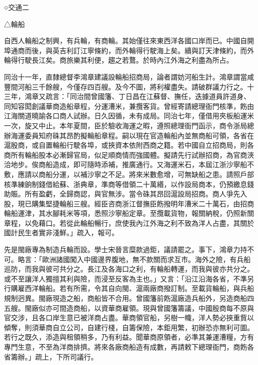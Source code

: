 
\begin{pinyinscope}
○交通二

△輪船

自西人輪船之制興，有兵輪，有商輪。其始僅往來東西洋各國口岸而已。中國自開埠通商而後，與英吉利訂江寧條約，而外輪得行駛海上矣。續與訂天津條約，而外輪得行駛長江矣。商旅樂其利便，趨之若鶩。於時內江外海之利盡為所占。

同治十一年，直隸總督李鴻章建議設輪船招商局，論者謂妨河船生計。鴻章謂當咸豐間河船三千餘艘，今僅存四百艘。及今不圖，將利權盡失。請破群議力行之。十三年，鴻章又疏言：「同治間曾國籓、丁日昌在江蘇督、撫任，迭據道員許道身、同知容閎創議華商造船章程，分運漕米，兼攬客貨。曾經寄請總理衙門核準，飭由江海關道曉諭各口商人試辦。日久因循，未有成局。同治七年，僅借用夾板船運米一次，旋又中止。本年夏間，臣於驗收海運之暇，遵照總理衙門函示，商令浙局總辦海運委員知府硃其昂酌擬輪船章程。嗣以現在官造輪船內並無商船可領，各省在滬殷商，或自置輪船行駛各埠，或挾資本依附西商之籍。若中國自立招商局，則各商所有輪船股本必漸歸官局，似足順商情而強國體。擬請先行試辦招商，為官商浹洽地步。俟商船造成，即可隨時添補，推廣通行。又海運米石，本屆江浙沙寧船不敷，應請以商船分運，以補沙寧之不足。將來米數愈增，可無缺船之患。請照戶部核準練餉制錢借給蘇、浙典章，準商等借領二十萬緡，以作設局商本，仍預繳息錢助賑。所有盈虧，全歸商認，與官無涉。當令硃其昂回滬設局招商。商人爭先入股，現已購集堅捷輪船三艘。經臣咨商浙江督撫臣飭撥明年漕米二十萬石，由招商輪船運津，其水腳耗米等項，悉照沙寧船定章。至攬載貨物，報關納稅，仍照新關章程，以免藉口。若從此輪船暢行，庶使我內江外海之利不致為洋人占盡，其關於國計民生者實非淺鮮。」疏入，報可。

先是閩廠專為制造兵輪而設。學士宋晉言糜款過鉅，議請罷之。事下，鴻章力持不可。略言：「歐洲諸國闖入中國邊界腹地，無不款關而求互市。海外之險，有兵船巡防，而我與彼可共分之。長江及各海口之利，有輪船轉運，而我與彼亦共分之。或不至讓洋人獨擅其利與險，而浸至反客為主也。」又言：「沿江沿海各省，不準另行購雇西洋輪船。若有所需，令其自向閩、滬兩廠商撥訂制。至載貨輪船，與兵船規制迥異。閩廠現造之船，商船皆不合用。曾國籓前飭滬廠造兵船外，另造商船四五艘。閩廠似亦可間造商船，以資華商雇領。現與曾國籓籌議，中國殷商每不原與官交涉，且各口岸生意已被洋商占盡。華商領官船，另樹一幟，洋人勢必挾重貲以傾奪，則須華商自立公司，自建行棧，自籌保險，本鉅用繁，初辦恐亦無利可圖。若行之既久，添造與租領稍多，乃有利益。聞華商原領者，必準其兼運漕糧，方有專門生意，不至為洋商排擠。將來各廠商船造有成數，再請敕下總理衙門，商飭各省籌辦。」疏上，下所司議行。


\end{pinyinscope}

